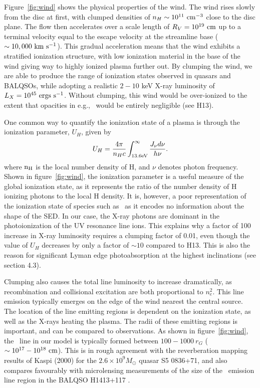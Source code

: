 \documentclass[useAMS,usenatbib]{mn2e_x}
\begin{document}
Figure~\ref{fig:wind} shows the physical properties of the wind.
The wind rises slowly from the disc at first, with clumped densities
of $n_H \sim 10^{11}~\rm{cm^{-3}}$ close to the disc plane.
The flow then accelerates over a scale length of $R_V=10^{19}~\rm{cm}$
up to a terminal velocity equal to the escape velocity at the streamline base
($\sim10,000~\rm{km~s^{-1}}$). This gradual acceleration means that
the wind exhibits a stratified ionization structure, with low ionization material
in the base of the wind giving way to highly ionized plasma further out.
By clumping the wind, we are able to produce the range of ionization states observed
in quasars and BALQSOs, while adopting a realistic $2-10$ keV X-ray luminosity
of $L_{X}=10^{45}~\rm{ergs~s^{-1}}$. Without clumping, this wind would be over-ionized 
to the extent that opacities in e.g., \civ\ would be entirely negligible (see H13).

One common way to quantify the ionization state of a plasma
is through the ionization parameter, $U_H$, given by
\begin{equation}
U_H = \frac{4\pi}{n_H c}\int_{13.6{\rm{eV}}}^{\infty}\frac{{J_{\nu}d\nu}}{h\nu}.
\end{equation}
\noindent where $\rm{n_H}$ is the local number density of H, and $\nu$ denotes photon 
frequency. Shown in figure~\ref{fig:wind},
the ionization parameter is a useful measure of the global ionization state,
as it represents the ratio of the number density of 
H ionizing photons to the local H density.
It is, however, a poor representation of the 
ionization state of species such as \civ\ as it encodes no information
about the shape of the SED. In our case, the X-ray photons 
are dominant in the photoionization of the UV resonance line ions. 
This explains why a factor of 100 increase in X-ray luminosity requires
a clumping factor of 0.01, even though the value of $U_H$ decreases by only a factor of $\sim10$ 
compared to H13. This is also the reason for significant Lyman edge photoabsorption
at the highest inclinations (see section 4.3).

Clumping also causes the total line luminosity to increase dramatically,
as recombination and collisional excitation are both proportional to
$n_e^2$. This line emission typically emerges on the edge of the wind
nearest the central source. The location of the line emitting regions
is dependent on the ionization state, as well as the X-rays heating the plasma.
The radii of these emitting regions is important,
and can be compared to observations. As shown in figure~\ref{fig:wind},
the \civ\ line in our model is typically formed between 
$100-1000~r_G$ ($\sim10^{17}-10^{18}~\rm{cm}$).
This is in rough agreement with the reverberation mapping 
results of Kaspi (2000) for the $2.6\times10^{9} M_\odot$ quasar S5 0836+71,
and also compares favourably with microlensing measurements of the size of the
\civ\ emission line region in the BALQSO H1413+117 \citep{odowd2015}.
\end{document}
